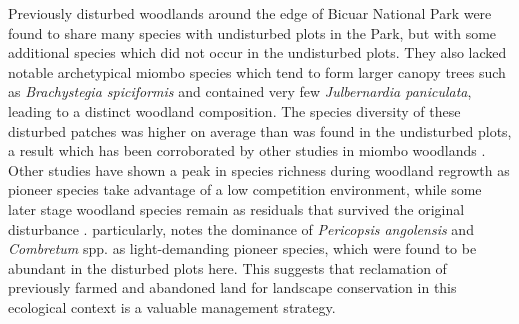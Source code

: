 \documentclass[diversity,article,submit,moreauthors,pdftex]{Definitions/mdpi}
\begin{document}
Previously disturbed woodlands around the edge of Bicuar National Park were found to share many species with undisturbed plots in the Park, but with some additional species which did not occur in the undisturbed plots. They also lacked notable archetypical miombo species which tend to form larger canopy trees such as \textit{Brachystegia spiciformis} and contained very few \textit{Julbernardia paniculata}, leading to a distinct woodland composition. The species diversity of these disturbed patches was higher on average than was found in the undisturbed plots, a result which has been corroborated by other studies in miombo woodlands \citep{Caro2001, McNicol2018b, Shackleton2000}. Other studies have shown a peak in species richness during woodland regrowth as pioneer species take advantage of a low competition environment, while some later stage woodland species remain as residuals that survived the original disturbance \citep{Goncalves2017, Kalaba2013}. \citet{Goncalves2017} particularly, notes the dominance of \textit{Pericopsis angolensis} and \textit{Combretum} spp. as light-demanding pioneer species, which were found to be abundant in the disturbed plots here. This suggests that reclamation of previously farmed and abandoned land for landscape conservation in this ecological context is a valuable management strategy.
\end{document}
